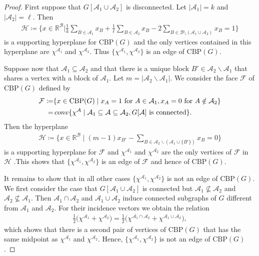 \documentclass[12pt]{amsart}
\newcommand{\R}{\mathbb{R}}
\newcommand{\conv}{\mathop{\rm conv}\nolimits}
\newcommand{\CBP}{\mathrm{CBP}}
\newcommand{\B}{\mathcal{B}}
\newcommand{\A}{\mathcal{A}}
\renewcommand{\H}{\mathcal{H}}
\newcommand{\F}{\mathcal{F}}
\begin{document}
\begin{proof}
    First suppose that $G[\A_1 \cup \A_2]$ is disconnected. Let $\vert \A_1 \vert=k$ and $\vert \A_2 \vert =\ell$. Then
    \begin{align*}
        \H \coloneqq \Big\{ x \in \R^\B \Big\vert \textstyle{\frac{1}{k}}\sum_{B \in \A_1}x_B+\textstyle{\frac{1}{\ell}} \sum_{B \in\A_2}x_B-2\sum_{B \in \B \setminus (\A_1 \cup \A_2)}x_B=1 \Big\} 
    \end{align*}
    is a supporting hyperplane for $\CBP(G)$ and the only vertices contained in this hyperplane are $\chi^{\A_1}$ and $\chi^{\A_2}$. Thus $\{\chi^{\A_1},\chi^{\A_2}\}$ is an edge of $\CBP(G)$.

    Suppose now that $\A_1 \subseteq \A_2$ and that there is a unique block $B' \in \A_2 \backslash \A_1$ that shares a vertex with a block of $\A_1$. Let $m=\vert \A_2 \backslash \A_1 \vert$. We consider the face $\mathcal{F}$ of $\CBP(G)$ defined by
    \begin{align*}
        \F \coloneqq & \{x \in \CBP(G) \mid x_A=1 \text{ for } A \in \A_1, x_A=0 \text{ for } A \notin \A_2\} \\
        =&\conv\{\chi^\A \mid \A_1 \subseteq \A \subseteq \A_2, G[\A] \text{ is connected} \}.
    \end{align*}
    Then the hyperplane
        \begin{align*}
            \H \coloneqq \{x \in \R^\B \mid (m-1) x_{B'}-\textstyle{\sum_{B\in \A_2 \backslash \left(\A_1 \cup \{B'\}\right)}x_B}=0 \}
       \end{align*}
    is a supporting hyperplane for $\F$ and $\chi^{\A_1}$ and $\chi^{\A_2}$ are the only vertices of $\F$ in $\H$ .This shows that $\{\chi^{\A_1},\chi^{\A_2}\}$ is an edge of $\F$ and hence of $\CBP(G)$.

    It remains to show that in all other cases $\{\chi^{\A_1},\chi^{\A_2}\}$ is not an edge of $\CBP(G)$. We first consider the case that $G[\A_1 \cup \A_2]$ is connected but $\A_1 \nsubseteq \A_2$ and $\A_2 \nsubseteq \A_1$. Then $\A_1 \cap \A_2$ and $\A_1 \cup \A_2$ induce connected subgraphs of $G$ different from $\A_1$ and $\A_2$. For their incidence vectors we obtain the relation
    \begin{align*}
        \frac{1}{2}\Big(\chi^{\A_1}+\chi^{\A_2}\Big)=\frac{1}{2}\Big(\chi^{\A_1\cap \A_2}+\chi^{\A_1 \cup \A_2}\Big),
    \end{align*}
    which shows that there is a second pair of vertices of $\CBP(G)$ that has the same midpoint as $\chi^{\A_1}$ and $\chi^{\A_2}$. Hence, $\{\chi^{\A_1},\chi^{\A_2}\}$ is not an edge of $\CBP(G)$.
    

\end{proof}
\end{document}
